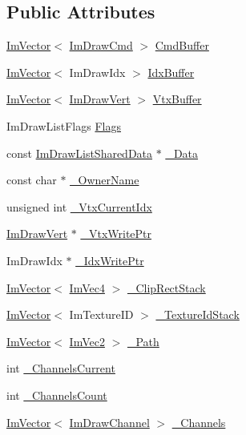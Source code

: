 \subsection*{Public Attributes}
\begin{DoxyCompactItemize}
\item 
\hyperlink{class_im_vector}{Im\+Vector}$<$ \hyperlink{struct_im_draw_cmd}{Im\+Draw\+Cmd} $>$ \hyperlink{struct_im_draw_list_a67a4b5cc4c83bc3b81d96c46cbd38a07}{Cmd\+Buffer}
\item 
\hyperlink{class_im_vector}{Im\+Vector}$<$ Im\+Draw\+Idx $>$ \hyperlink{struct_im_draw_list_adf292ff70a954d82daf061c609e75dfc}{Idx\+Buffer}
\item 
\hyperlink{class_im_vector}{Im\+Vector}$<$ \hyperlink{struct_im_draw_vert}{Im\+Draw\+Vert} $>$ \hyperlink{struct_im_draw_list_aa8ff4aee39cf3c3791b7e29a7b4264be}{Vtx\+Buffer}
\item 
Im\+Draw\+List\+Flags \hyperlink{struct_im_draw_list_ada2c004661663ef875f4d4c7ec0b4557}{Flags}
\item 
const \hyperlink{struct_im_draw_list_shared_data}{Im\+Draw\+List\+Shared\+Data} $\ast$ \hyperlink{struct_im_draw_list_a606bbd354211fe6f84cc11ebe53e7903}{\+\_\+\+Data}
\item 
const char $\ast$ \hyperlink{struct_im_draw_list_a643f385fb9d5fc35a431e72a10a212f5}{\+\_\+\+Owner\+Name}
\item 
unsigned int \hyperlink{struct_im_draw_list_a2228793183665bc3d8612795555fe505}{\+\_\+\+Vtx\+Current\+Idx}
\item 
\hyperlink{struct_im_draw_vert}{Im\+Draw\+Vert} $\ast$ \hyperlink{struct_im_draw_list_a67f870f5140bf1cab14b8515b7386073}{\+\_\+\+Vtx\+Write\+Ptr}
\item 
Im\+Draw\+Idx $\ast$ \hyperlink{struct_im_draw_list_a771f4c7f71873852fe030c3e498e5843}{\+\_\+\+Idx\+Write\+Ptr}
\item 
\hyperlink{class_im_vector}{Im\+Vector}$<$ \hyperlink{struct_im_vec4}{Im\+Vec4} $>$ \hyperlink{struct_im_draw_list_ae950024f053f3c94dc2c763d20be609d}{\+\_\+\+Clip\+Rect\+Stack}
\item 
\hyperlink{class_im_vector}{Im\+Vector}$<$ Im\+Texture\+ID $>$ \hyperlink{struct_im_draw_list_a848faddd121da050214b8d8159e5e704}{\+\_\+\+Texture\+Id\+Stack}
\item 
\hyperlink{class_im_vector}{Im\+Vector}$<$ \hyperlink{struct_im_vec2}{Im\+Vec2} $>$ \hyperlink{struct_im_draw_list_a5bdc39abf351360500048628b8dc1b07}{\+\_\+\+Path}
\item 
int \hyperlink{struct_im_draw_list_a143ff30108f3dca8c28c7925e23d358b}{\+\_\+\+Channels\+Current}
\item 
int \hyperlink{struct_im_draw_list_ae3854c12dbac41400f4acb65192f5015}{\+\_\+\+Channels\+Count}
\item 
\hyperlink{class_im_vector}{Im\+Vector}$<$ \hyperlink{struct_im_draw_channel}{Im\+Draw\+Channel} $>$ \hyperlink{struct_im_draw_list_ae6be941728e5b2c81a03c78e4aa22629}{\+\_\+\+Channels}
\end{DoxyCompactItemize}


